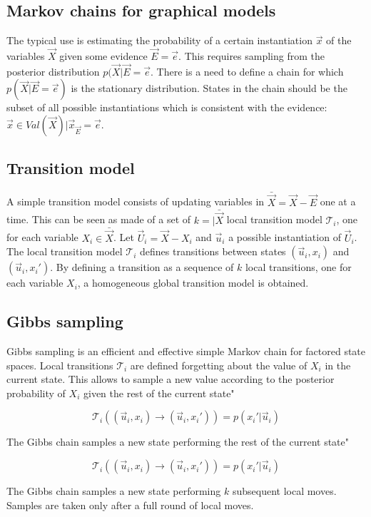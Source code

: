 	\subsection{Markov chains for graphical models}
	The typical use is estimating the probability of a certain instantiation $\vec{x}$ of the variables $\vec{X}$ given some evidence $\vec{E}=\vec{e}$.
	This requires sampling from the posterior distribution $p(\vec{X}|\vec{E}=\vec{e}$.
	There is a need to define a chain for which $p(\vec{X}|\vec{E}=\vec{e})$ is the stationary distribution.
	States in the chain should be the subset of all possible instantiations which is consistent with the evidence: $\vec{x}\in Val(\vec{X})|\vec{x}_{\vec{E}} = \vec{e}$.

	\subsection{Transition model}
	A simple transition model consists of updating variables in $\bar{\vec{X}} = \vec{X}-\vec{E}$ one at a time.
	This can be seen as made of a set of $k=|\bar{\vec{X}}$ local transition model $\mathcal{T}_i$, one for each variable $X_i\in\bar\vec{X}$.
	Let $\vec{U}_i = \vec{X}-X_i$ and $\vec{u}_i$ a possible instantiation of $\vec{U}_i$.
	The local transition model $\mathcal{T}_i$ defines transitions between states $(\vec{u}_i, x_i)$ and $(\vec{u}_i, x_i')$.
	By defining  a transition as a sequence of $k$ local transitions, one for each variable $X_i$, a homogeneous global transition model is obtained.

	\subsection{Gibbs sampling}
	Gibbs sampling is an efficient and effective simple Markov chain for factored state spaces.
	Local transitions $\mathcal{T}_i$ are defined forgetting about the value of $X_i$ in the current state.
	This allows to sample a new value according to the posterior probability of $X_i$ given the rest of the current state"

	$$\mathcal{T}_i((\vec{u}_i, x_i)\rightarrow(\vec{u}_i, x_i')) = p(x_i'|\vec{u}_i)$$

	The Gibbs chain samples a new state performing the rest of the current state"

	$$\mathcal{T}_i((\vec{u}_i, x_i)\rightarrow(\vec{u}_i, x_i')) = p(x_i'|\vec{u}_i)$$

	The Gibbs chain samples a new state performing $k$ subsequent local moves.
	Samples are taken only after a full round of local moves.

